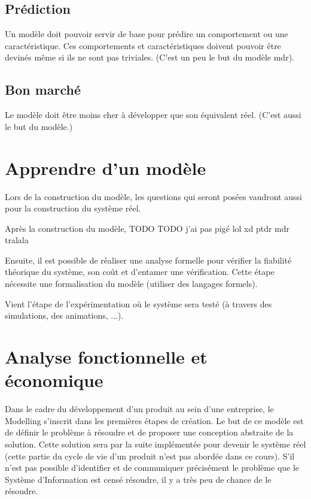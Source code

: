 \subsection{Prédiction}

Un modèle doit pouvoir servir de base pour prédire un comportement ou une caractéristique. Ces comportements et caractéristiques doivent pouvoir être devinés même si ils ne sont pas triviales. (C'est un peu le but du modèle mdr).

\subsection{Bon marché}

Le modèle doit être moins cher à développer que son équivalent réel. (C'est aussi le but du modèle.)

\section{Apprendre d'un modèle}

Lors de la construction du modèle, les questions qui seront posées vaudront aussi pour la construction du système réel.

Après la construction du modèle, TODO TODO j'ai pas pigé lol xd ptdr mdr tralala

Ensuite, il est possible de réaliser une analyse formelle pour vérifier la fiabilité théorique du système, son coût et d'entamer une vérification. Cette étape nécessite une formalisation du modèle (utiliser des langages formels).

Vient l'étape de l'expérimentation où le système sera testé (à travers des simulations, des animations, ...).

\section{Analyse fonctionnelle et économique}

Dans le cadre du développement d'un produit au sein d'une entreprise, le Modelling s'inscrit dans les premières étapes de création. Le but de ce modèle est de définir le problème à résoudre et de proposer une conception abstraite de la solution. Cette solution sera par la suite implémentée pour devenir le système réel (cette partie du cycle de vie d'un produit n'est pas abordée dans ce cours). S'il n'est pas possible d'identifier et de communiquer précisément le problème que le Système d'Information est censé résoudre, il y a très peu de chance de le résoudre.

